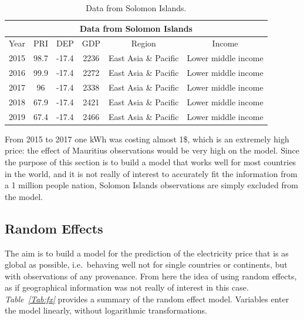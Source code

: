 \documentclass[a4paper,12pt]{book}
\begin{document}
\begin{table}[tb]
\begin{center}
\begin{tabular}{|c|c|c|c|c|c|}
\hline
\multicolumn{6}{|c|}{Data from Solomon Islands}\\
\hline
Year&PRI&DEP&GDP&Region&Income\\
\hline
2015&98.7&-17.4&2236&East Asia \& Pacific&Lower middle income\\
2016&99.9&-17.4&2272&East Asia \& Pacific&Lower middle income\\
2017&96&-17.4&2338&East Asia \& Pacific&Lower middle income\\
2018&67.9&-17.4&2421&East Asia \& Pacific&Lower middle income\\
2019&67.4&-17.4&2466&East Asia \& Pacific&Lower middle income\\
\hline
\end{tabular}
\caption{Data from Solomon Islands.}
\label{Tab:solomon}
\end{center}
\end{table}

From 2015 to 2017 one kWh was costing almost 1\$, which is an extremely high price: the effect of Mauritius observations would be very high on the model. Since the purpose of this section is to build a model that works well for most countries in the world, and it is not really of interest to accurately fit the information from a 1 million people nation, Solomon Islands observations are simply excluded from the model.

\subsection{Random Effects}

The aim is to build a model for the prediction of the electricity price that is as global as possible, i.e.\ behaving well not for single countries or continents, but with observations of any provenance. From here the idea of using random effects, as if geographical information was not really of interest in this case. \textit{Table~\ref{Tab:fx}} provides a summary of the random effect model. Variables enter the model linearly, without logarithmic transformations.
\end{document}
